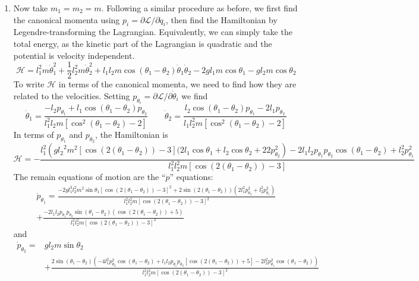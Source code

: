 \documentclass{article}
\theoremstyle{definition}
\newcommand{\p}{\partial}
\newcommand{\lag}{\mathcal{L}}
\newcommand{\ham}{\mathcal{H}}
\newcommand{\f}[2]{\frac{#1}{#2}}
\begin{document}
\begin{enumerate}[label=(\alph*)]
	
	\item Now take $m_1 = m_2 = m$. Following a similar procedure as before, we first find the canonical momenta using $p_i = \p \lag / \p \dot{q}_i$, then find the Hamiltonian by Legendre-transforming the Lagrangian. Equivalently, we can simply take the total energy, as the kinetic part of the Lagrangian is quadratic and the potential is velocity independent. 
	\begin{equation*}
	\boxed{\ham = l_1^2 m \dot\theta_1^2 +\f{1}{2}l_2^2 m \dot\theta_2^2 + l_1l_2m\cos(\theta_1-\theta_2)\dot\theta_1\dot\theta_2 - 2gl_1m\cos\theta_1 - g l_2 m \cos\theta_2 }
	\end{equation*}
	To write $\ham$ in terms of the canonical momenta, we need to find how they are related to the velocities. Setting $p_{\theta_i} = \p \lag / \p \dot{\theta}_i$ we find 
	\begin{equation*}
	\dot{\theta}_1 = \f{-l_2 p_{\theta_1} + l_1\cos(\theta_1-\theta_2)p_{\theta_2}}{l_1^2 l_2 m [\cos^2(\theta_1 - \theta_2) - 2]}
	\quad\quad 
	\dot{\theta}_2 = \f{l_2\cos(\theta_1-\theta_2)p_{\theta_1} - 2l_1 p_{\theta_2}}{l_1l_2^2 m [\cos^2(\theta_1 - \theta_2)-2]}
	\end{equation*}
	In terms of $p_{\theta_1}$ and $p_{\theta_2}$, the Hamiltonian is 
	\begin{equation*}
	\boxed{\ham = 
	-\frac{l_1^2 \left(g{l_2}^2 m^2 [\cos (2 (\theta_1-\theta_2))-3] 
	(2l_1 \cos \theta_1+l_2 \cos \theta_2 +2 2p_{\theta_2}^2\right)
	-2l_1l_2p_{\theta_1}p_{\theta_2} \cos (\theta_1-\theta_2)+ l_2^2 p_{\theta_1}^2}
	{l_1^2l_2^2 m [\cos (2 (\theta_1-\theta_2))-3]}}
	\end{equation*}
	The remain equations of motion are the ``$\dot{p}$'' equations:
	\begin{align*}
	\dot{p}_{\theta_1} = 
	\frac{-2 g l_1^3 l_2^2 m^2 \sin \theta_1[\cos
		(2 (\theta_1-\theta_2))-3]^2
		+2 \sin (2
		(\theta_1-\theta_2)) \left(2 l_1^2
		p_{\theta_2}^2+l_2^2 p_{\theta_1}^2\right)
		}
	{l_1^2 l_2^2 m [\cos (2
		(\theta_1-\theta_2))-3]^2} \\
	+ \frac{-2
		l_1l_2 p_{\theta_1}p_{\theta_2} \sin
		(\theta_1-\theta_2) (\cos (2 (\theta_1-\theta_2))+5)}{l_1^2 l_2^2 m [\cos (2
		(\theta_1-\theta_2))-3]^2}
	\end{align*}
	and 
	\begin{align*}
	\dot{p}_{\theta_2} 
	= 
	&g l_2 m \sin\theta_2 \\
	&+\frac{2 \sin (\theta_1-\theta_2) \left(-4
		l_1^2 p_{\theta_2}^2 \cos (\theta_1-\theta_2)+l_1 l_2 p_{\theta_1}p_{\theta_2} [\cos (2 (\theta_1-\theta_2))+5]-2 l_2^2 p_{\theta_1}^2 \cos (\theta_1-\theta_2)\right)}{l_1^2 l_2^2 m [\cos (2 (\theta_1-\theta_2))-3]^2}
	\end{align*}
	

\end{enumerate}
\end{document}
